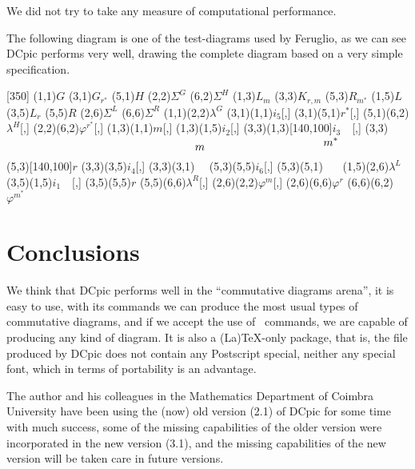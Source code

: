 \documentclass{europroc}
\begin{document}
We did not try to take any measure of computational performance. 

The following diagram is one of the test-diagrams used by Feruglio, as
we can see DCpic performs very well, drawing the complete diagram
based on a very simple specification.

\newcommand{\barraA}{\vrule height2em width0em depth0em}
\newcommand{\barraB}{\vrule height1.6em width0em depth0em}

\centerline{
\begindc{\commdiag}[350]
\obj(1,1){$G$}
\obj(3,1){$G_{r^*}$}
\obj(5,1){$H$}
\obj(2,2){$\Sigma^G$}
\obj(6,2){$\Sigma^H$}
\obj(1,3){$L_m$}
\obj(3,3){$K_{r,m}$}
\obj(5,3){$R_{m^*}$}
\obj(1,5){$L$}
\obj(3,5){$L_r$}
\obj(5,5){$R$}
\obj(2,6){$\Sigma^L$}
\obj(6,6){$\Sigma^R$}
\mor(1,1)(2,2){$\lambda^G$}
\mor(3,1)(1,1){$i_5$}[\atleft,\aplicationarrow]
\mor(3,1)(5,1){$r^*$}[\atright,\solidarrow]
\mor(5,1)(6,2){$\lambda^H$}[\atright,\dashArrow]
\mor(2,2)(6,2){$\varphi^{r^*}$}[\atright,\solidarrow]
\mor(1,3)(1,1){$m$}[\atright,\solidarrow]
\mor(1,3)(1,5){$i_2$}[\atleft,\aplicationarrow]
\mor(3,3)(1,3)[140,100]{$i_3\quad$}[\atright,\aplicationarrow]
\mor(3,3)(5,3)[140,100]{$r$}
\mor(3,3)(3,5){$i_4$}[\atright,\aplicationarrow]
\mor(3,3)(3,1){$\stackrel{\displaystyle m}{\barraB}$}
\mor(5,3)(5,5){$i_6$}[\atright,\aplicationarrow]
\mor(5,3)(5,1){$\stackrel{\displaystyle m^*}{\barraA}$}
\mor(1,5)(2,6){$\lambda^L$}
\mor(3,5)(1,5){$i_1\quad$}[\atright,\aplicationarrow]
\mor(3,5)(5,5){$r$}
\mor(5,5)(6,6){$\lambda^R$}[\atright,\solidarrow]
\mor(2,6)(2,2){$\varphi^m$}[\atright,\solidarrow]
\mor(2,6)(6,6){$\varphi^r$}
\mor(6,6)(6,2){$\varphi^{m^*}$}
\enddc
}


\section{Conclusions}

We think that DCpic performs well in the ``commutative diagrams
arena'', it is easy to use, with its commands we can produce
the most usual types of commutative diagrams, and if we accept the use
of \PiCTeX\ commands, we are capable of producing any kind of
diagram. It is also a (La)\TeX -only package, that is, the file
produced by DCpic does not  contain any Postscript special, neither
any special font, which in terms of portability is an advantage. 

The author and his colleagues in the Mathematics Department of Coimbra
University have been using the (now) old version (2.1) of DCpic for
some time with much success, some of the missing capabilities of the
older version were incorporated in the new version (3.1), and the
missing capabilities of the new version will be taken care in future
versions. 
\end{document}
